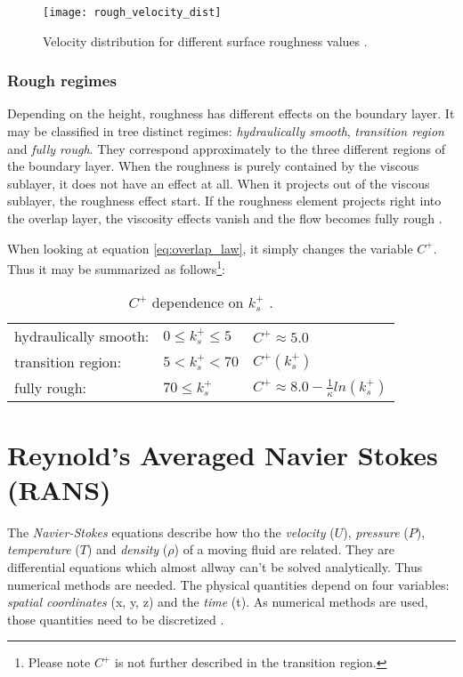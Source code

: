 \begin{figure}[H] \centering
\texttt{[image: rough\_velocity\_dist]}
    \caption{Velocity distribution for different surface roughness values \cite{Schlichting2018}.}
    \label{fig:rough_velocity_dist}
\end{figure}


\subsubsection{Rough regimes}
Depending on the height, roughness has different effects on the boundary layer.
It may be classified in tree distinct regimes: \textit{hydraulically smooth},
\textit{transition region} and \textit{fully rough}. They correspond
approximately to the three different regions of the boundary layer. When the
roughness is purely contained by the viscous sublayer, it does not have an
effect at all. When it projects out of the viscous sublayer, the roughness
effect start. If the roughness element projects right into the overlap layer,
the viscosity effects vanish and the flow becomes fully rough
\cite{Schlichting2018}.


When looking at equation \ref{eq:overlap_law}, it simply changes the variable
$C^{+}$. Thus it may be summarized as follows\footnote{Please note $C^{+}$ is
not further described in the transition region.}:

\begin{table}[H]
  \centering
  \begin{tabular}{l l l}
    hydraulically smooth:   & $0 \leq k_{s}^{+} \leq 5$   & $C^{+} \approx 5.0$\\
    transition region:      & $ 5 < k_{s}^{+} < 70$ & $C^{+}(k_{s}^{+})$\\
    fully rough:            & $70 \leq k_{s}^{+}$      & $C^{+} \approx 8.0 - \frac{1}{\kappa} ln(k_{s}^{+})$
  \end{tabular}
  \caption{$C^{+}$ dependence on $k_{s}^{+}$ \cite{Schlichting2018}.}
  \label{tab:opt_prob}
\end{table}

\section{Reynold's Averaged Navier Stokes (RANS)}
The \textit{Navier-Stokes} equations describe how tho the \textit{velocity}
($U$), \textit{pressure} ($P$), \textit{temperature} ($T$) and \textit{density}
($\rho$) of a moving fluid are related. They are differential equations which
almost allway can't be solved analytically. Thus numerical methods are needed.
The physical quantities depend on four variables: \textit{spatial coordinates}
(x, y, z) and the \textit{time} (t). As numerical methods are used, those
quantities need to be discretized \cite{nasaNS}.

